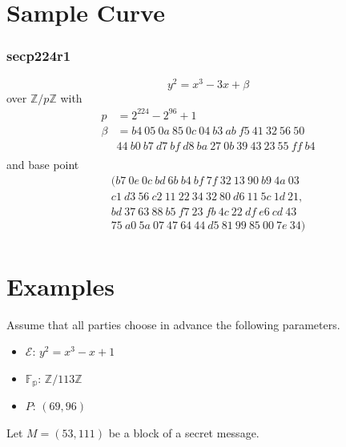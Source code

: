 \documentclass{beamer}
\newcommand{\zmod}[1]{\ensuremath{\mathbb{Z}/#1\mathbb{Z}}}
\begin{document}
    \section{Sample Curve}
    \begin{frame}
        \frametitle{secp224r1}
        \[y^2 = x^3 -3x + \beta\]
        over \zmod{p} with
        \begin{align*}
        p &= 2^224 - 2^96 + 1 \\
        \beta &= b4~05~0a~85~0c~04~b3~ab~f5~41~32~56~50 \\
        & 44~b0~b7~d7~bf~d8~ba~27~0b~39~43~23~55~ff~b4 \\
        \end{align*}
        and base point
        \begin{align*}
        (b7~0e~0c~bd~6b~b4~bf~7f~32~13~90~b9~4a~03 \\
        c1~d3~56~c2~11~22~34~32~80~d6~11~5c~1d~21,\\
        bd~37~63~88~b5~f7~23~fb~4c~22~df~e6~cd~43 \\
        75~a0~5a~07~47~64~44~d5~81~99~85~00~7e~34) \\
        \end{align*}
    \end{frame}

    \section{Examples}
    \begin{frame}
        Assume that all parties choose in advance the
        following parameters.
        \begin{itemize}
            \item \(\mathcal{E}\): \(y^2 = x^3 - x + 1\)
            \item \(\mathbb{F_p}\): \zmod{113}
            \item \(P\): \((69, 96)\)
        \end{itemize}
        \vfill
        Let \(M = (53, 111)\) be a block of a secret message.
    \end{frame}
\end{document}

